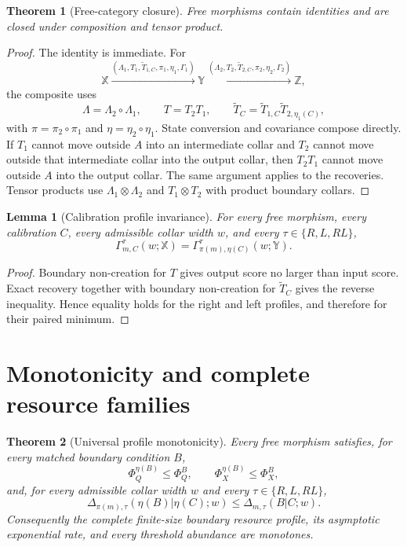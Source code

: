 \documentclass[11pt]{article}
\newtheorem{theorem}{Theorem}
\newtheorem{lemma}{Lemma}
\begin{document}
\begin{theorem}[Free-category closure]
Free morphisms contain identities and are closed under composition and tensor product.
\end{theorem}

\begin{proof}
The identity is immediate. For
\[
\mathbb X\xrightarrow{(\Lambda_1,T_1,\widetilde T_{1,C},\pi_1,\eta_1,\Gamma_1)}\mathbb Y
\xrightarrow{(\Lambda_2,T_2,\widetilde T_{2,C},\pi_2,\eta_2,\Gamma_2)}\mathbb Z,
\]
the composite uses
\[
\Lambda=\Lambda_2\circ\Lambda_1,
\qquad
T=T_2T_1,
\qquad
\widetilde T_C=\widetilde T_{1,C}\widetilde T_{2,\eta_1(C)},
\]
with $\pi=\pi_2\circ\pi_1$ and $\eta=\eta_2\circ\eta_1$. State conversion and covariance compose directly. If $T_1$ cannot move outside $A$ into an intermediate collar and $T_2$ cannot move outside that intermediate collar into the output collar, then $T_2T_1$ cannot move outside $A$ into the output collar. The same argument applies to the recoveries. Tensor products use $\Lambda_1\otimes\Lambda_2$ and $T_1\otimes T_2$ with product boundary collars.
\end{proof}

\begin{lemma}[Calibration profile invariance]
For every free morphism, every calibration $C$, every admissible collar width $w$, and every
$\tau\in\{R,L,RL\}$,
\[
\Gamma_{m,C}^{\tau}(w;\mathbb X)
=\Gamma_{\pi(m),\eta(C)}^{\tau}(w;\mathbb Y).
\]
\end{lemma}

\begin{proof}
Boundary non-creation for $T$ gives output score no larger than input score. Exact recovery together with boundary non-creation for $\widetilde T_C$ gives the reverse inequality. Hence equality holds for the right and left profiles, and therefore for their paired minimum.
\end{proof}

\section{Monotonicity and complete resource families}

\begin{theorem}[Universal profile monotonicity]
Every free morphism satisfies, for every matched boundary condition $B$,
\[
\Phi_Q^{\eta(B)}\le\Phi_Q^B,
\qquad
\Phi_X^{\eta(B)}\le\Phi_X^B,
\]
and, for every admissible collar width $w$ and every
$\tau\in\{R,L,RL\}$,
\[
\Delta_{\pi(m),\tau}(\eta(B)|\eta(C);w)
\le
\Delta_{m,\tau}(B|C;w).
\]
Consequently the complete finite-size boundary resource profile, its asymptotic
exponential rate, and every threshold abundance are monotones.
\end{theorem}
\end{document}
